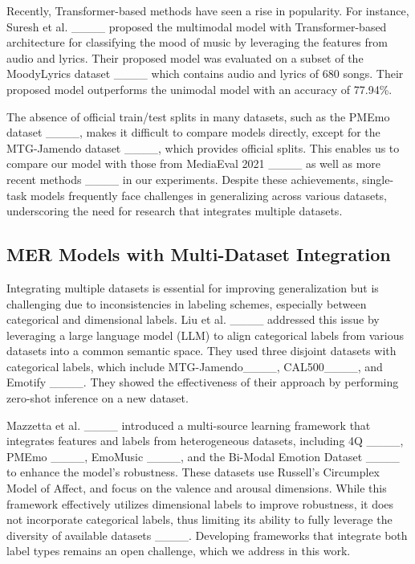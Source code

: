 
Recently, Transformer-based methods have seen a rise in popularity. For instance, Suresh et al. ____ proposed the multimodal model with Transformer-based architecture for classifying the mood of music by leveraging the features from audio and lyrics. Their proposed model was evaluated on a subset of the MoodyLyrics dataset ____ which contains audio and lyrics of 680 songs. Their proposed model outperforms the unimodal model with an accuracy of 77.94\%.

The absence of official train/test splits in many datasets, such as the PMEmo dataset ____, makes it difficult to compare models directly, except for the MTG-Jamendo dataset ____, which provides official splits. This enables us to compare our model with those from MediaEval 2021 ____ as well as more recent methods ____ in our experiments. Despite these achievements, single-task models frequently face challenges in generalizing across various datasets, underscoring the need for research that integrates multiple datasets.


\subsection{MER Models with Multi-Dataset Integration}
Integrating multiple datasets is essential for improving generalization but is challenging due to inconsistencies in labeling schemes, especially between categorical and dimensional labels. Liu et al. ____ addressed this issue by leveraging a large language model (LLM) to align categorical labels from various datasets into a common semantic space. They used three disjoint datasets with categorical labels, which include MTG-Jamendo____, CAL500____, and Emotify ____. They showed the effectiveness of their approach by performing zero-shot inference on a new dataset.

Mazzetta et al. ____ introduced a multi-source learning framework that integrates features and labels from heterogeneous datasets, including 4Q ____, PMEmo ____, EmoMusic ____, and the Bi-Modal Emotion Dataset ____ to enhance the model’s robustness. These datasets use Russell’s Circumplex Model of Affect, and focus on the valence and arousal dimensions. While this framework effectively utilizes dimensional labels to improve robustness, it does not incorporate categorical labels, thus limiting its ability to fully leverage the diversity of available datasets ____. Developing frameworks that integrate both label types remains an open challenge, which we address in this work.

